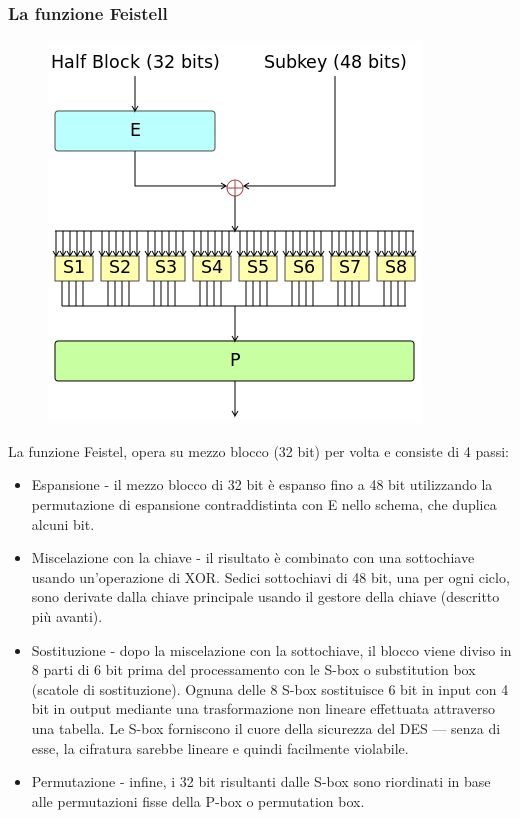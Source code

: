\documentclass[10pt,a4paper]{article}
\begin{document}
\subsubsection{La funzione Feistell}

\begin{figure}[htbp]
\includegraphics[scale=0.6]{immagini/DES_round.png}
\end{figure}

La funzione Feistel, opera su mezzo blocco (32 bit) per volta e consiste di 4 passi:
\begin{itemize}
\item  Espansione - il mezzo blocco di 32 bit è espanso fino a 48 bit utilizzando la permutazione di espansione contraddistinta con E nello schema, che duplica alcuni bit.
\item Miscelazione con la chiave - il risultato è combinato con una sottochiave usando un'operazione di XOR. Sedici sottochiavi di 48 bit, una per ogni ciclo, sono derivate dalla chiave principale usando il gestore della chiave (descritto più avanti).
\item Sostituzione - dopo la miscelazione con la sottochiave, il blocco viene diviso in 8 parti di 6 bit prima del processamento con le S-box o substitution box (scatole di sostituzione). Ognuna delle 8 S-box sostituisce 6 bit in input con 4 bit in output mediante una trasformazione non lineare effettuata attraverso una tabella. Le S-box forniscono il cuore della sicurezza del DES — senza di esse, la cifratura sarebbe lineare e quindi facilmente violabile.
\item Permutazione - infine, i 32 bit risultanti dalle S-box sono riordinati in base alle permutazioni fisse della P-box o permutation box.  
\end{itemize}
\end{document}
